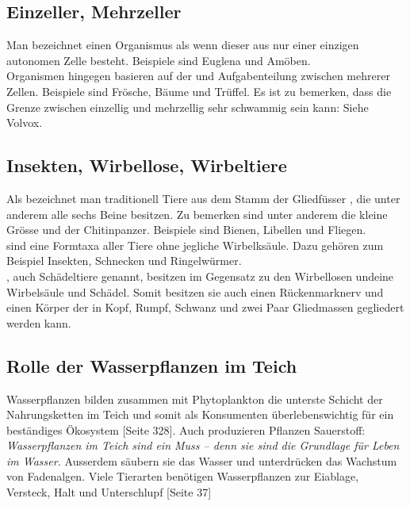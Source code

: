 \documentclass{article}
\begin{document}
    \subsection{Einzeller, Mehrzeller}
    
        Man bezeichnet einen Organismus als  wenn dieser aus nur einer einzigen autonomen Zelle besteht. Beispiele sind Euglena und Amöben. \\  Organismen hingegen basieren auf der und Aufgabenteilung zwischen mehrerer Zellen. Beispiele sind Frösche, Bäume und Trüffel.
        Es ist zu bemerken, dass die Grenze zwischen einzellig und mehrzellig sehr schwammig sein kann: Siehe Volvox.
    
    \subsection{Insekten, Wirbellose, Wirbeltiere}
    
        Als  bezeichnet man traditionell Tiere aus dem Stamm der Gliedfüsser , die unter anderem alle sechs Beine besitzen. Zu bemerken sind unter anderem die kleine Grösse und der Chitinpanzer. Beispiele sind Bienen, Libellen und Fliegen. \cite{EvolutionofInsects} \\
        \vspace{5mm}
         sind eine Formtaxa \cite{UniProtokolle} aller Tiere ohne jegliche Wirbelksäule. Dazu gehören zum Beispiel Insekten, Schnecken und Ringelwürmer. \cite{FrustfreiLernen} \\
        \vspace{5mm}
        , auch Schädeltiere genannt,  besitzen im Gegensatz zu den Wirbellosen undeine Wirbelsäule und Schädel. Somit besitzen sie auch einen Rückenmarknerv und einen Körper der in Kopf, Rumpf, Schwanz und zwei Paar Gliedmassen gegliedert werden kann. \cite{Lernhelfer}
        
    \subsection{Rolle der Wasserpflanzen im Teich}
    
        Wasserpflanzen bilden zusammen mit Phytoplankton die unterste Schicht der Nahrungsketten im Teich und somit als Konsumenten überlebenswichtig für ein beständiges Ökosystem \cite{Biobuch} [Seite 328]. Auch produzieren Pflanzen Sauerstoff: \textit{Wasserpflanzen im Teich sind ein Muss – denn sie sind die Grundlage für Leben im Wasser.}  Ausserdem säubern sie das Wasser und unterdrücken das Wachstum von Fadenalgen. \cite{Lupos} Viele Tierarten benötigen Wasserpflanzen zur Eiablage, Versteck, Halt und Unterschlupf \cite{Was} [Seite 37]
    
\end{document}
